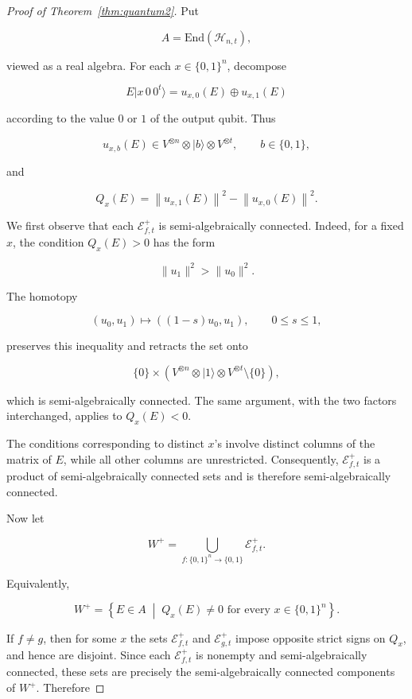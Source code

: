 \documentclass[10pt]{amsart}
\theoremstyle{definition}
\theoremstyle{remark}
\numberwithin{equation}{section}
\newcommand{\End}{\mathrm{End}}
\begin{document}
\begin{proof}[Proof of Theorem~\ref{thm:quantum2}]
Put

$$
A=\End(\mathcal H_{n,t}),
$$

viewed as a real algebra. For each \(x\in\{0,1\}^{n}\), decompose

$$
E\lvert x\,0\,0^{t}\rangle
=
u_{x,0}(E)\oplus u_{x,1}(E)
$$

according to the value \(0\) or \(1\) of the output qubit. Thus

$$
u_{x,b}(E)\in
V^{\otimes n}\otimes \lvert b\rangle\otimes V^{\otimes t},
\qquad b\in\{0,1\},
$$

and

$$
Q_x(E)
=
\left\|u_{x,1}(E)\right\|^{2}
-
\left\|u_{x,0}(E)\right\|^{2}.
$$

We first observe that each \(\mathcal E^{+}_{f,t}\) is semi-algebraically
connected. Indeed, for a fixed \(x\), the condition \(Q_x(E)>0\) has the
form

$$
\|u_1\|^{2}>\|u_0\|^{2}.
$$

The homotopy

$$
(u_0,u_1)\longmapsto ((1-s)u_0,u_1),
\qquad 0\leq s\leq1,
$$

preserves this inequality and retracts the set onto

$$
\{0\}\times
\left(
V^{\otimes n}\otimes\lvert1\rangle\otimes V^{\otimes t}
\setminus\{0\}
\right),
$$

which is semi-algebraically connected. The same argument, with the two
factors interchanged, applies to \(Q_x(E)<0\).

The conditions corresponding to distinct \(x\)'s involve distinct columns
of the matrix of \(E\), while all other columns are unrestricted.
Consequently, \(\mathcal E^{+}_{f,t}\) is a product of semi-algebraically
connected sets and is therefore semi-algebraically connected.

Now let

$$
W^{+}
=
\bigcup_{f:\{0,1\}^{n}\to\{0,1\}}
\mathcal E^{+}_{f,t}.
$$

Equivalently,

$$
W^{+}
=
\left\{
E\in A
\;\middle|\;
Q_x(E)\neq0
\text{ for every }x\in\{0,1\}^{n}
\right\}.
$$

If \(f\neq g\), then for some \(x\) the sets
\(\mathcal E^{+}_{f,t}\) and \(\mathcal E^{+}_{g,t}\) impose opposite
strict signs on \(Q_x\), and hence are disjoint. Since each
\(\mathcal E^{+}_{f,t}\) is nonempty and semi-algebraically connected,
these sets are precisely the semi-algebraically connected components of
\(W^{+}\). Therefore


\end{proof}
\end{document}
